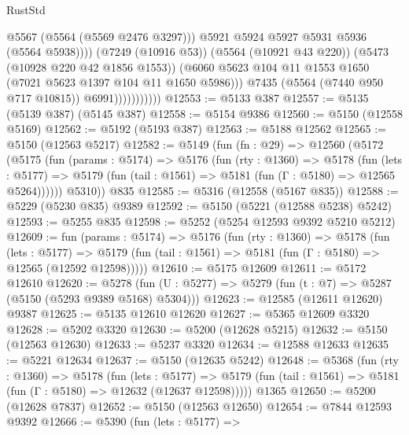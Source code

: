 \begin{lexlean}{RustStd}
\begin{coremodule}
                                    @5567
                                    (@5564 (@5569 @2476 @3297)))
                                  @5921
                                  @5924
                                  @5927
                                  @5931
                                  @5936
                                  (@5564 @5938))))
                            (@7249 (@10916 @53))
                            (@5564 (@10921 @43 @220))
                            (@5473 (@10928 @220 @42 @1856 @1553))
                            (@6060
                              @5623
                              @104
                              @11
                              @1553
                              @1650
                              (@7021 @5623 @1397 @104 @11 @1650 @5986)))
                          @7435
                          (@5564 (@7440 @950 @717 @10815))
                          @6991)))))))))))
@12553 := @5133 @387
@12557 := @5135 (@5139 @387) (@5145 @387)
@12558 := @5154 @9386
@12560 := @5150 (@12558 @5169)
@12562 := @5192 (@5193 @387)
@12563 := @5188 @12562
@12565 := @5150 (@12563 @5217)
@12582 := @5149
    (fun (fn : @29) =>
    @12560
      (@5172
        (@5175
          (fun (params : @5174) =>
          @5176
            (fun (rty : @1360) =>
            @5178
              (fun (lets : @5177) =>
              @5179 (fun (tail : @1561) => @5181 (fun (Γ : @5180) => @12565 @5264))))))
        @5310))
    @835
@12585 := @5316 (@12558 (@5167 @835))
@12588 := @5229 (@5230 @835) @9389
@12592 := @5150 (@5221 (@12588 @5238) @5242)
@12593 := @5255 @835
@12598 := @5252 (@5254 @12593 @9392 @5210 @5212)
@12609 := fun (params : @5174) =>
  @5176
    (fun (rty : @1360) =>
    @5178
      (fun (lets : @5177) =>
      @5179 (fun (tail : @1561) => @5181 (fun (Γ : @5180) => @12565 (@12592 @12598)))))
@12610 := @5175 @12609
@12611 := @5172 @12610
@12620 := @5278 (fun (U : @5277) => @5279 (fun (t : @7) => @5287 (@5150 (@5293 @9389 @5168) @5304)))
@12623 := @12585 (@12611 @12620) @9387
@12625 := @5135 @12610 @12620
@12627 := @5365 @12609 @3320
@12628 := @5202 @3320
@12630 := @5200 (@12628 @5215)
@12632 := @5150 (@12563 @12630)
@12633 := @5237 @3320
@12634 := @12588 @12633
@12635 := @5221 @12634
@12637 := @5150 (@12635 @5242)
@12648 := @5368
    (fun (rty : @1360) =>
    @5178
      (fun (lets : @5177) =>
      @5179 (fun (tail : @1561) => @5181 (fun (Γ : @5180) => @12632 (@12637 @12598)))))
    @1365
@12650 := @5200 (@12628 @7837)
@12652 := @5150 (@12563 @12650)
@12654 := @7844 @12593 @9392
@12666 := @5390
    (fun (lets : @5177) =>

\end{coremodule}
\end{lexlean}
